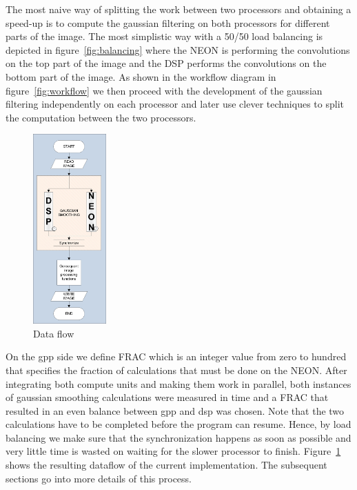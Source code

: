 The most naive way of splitting the work between two processors and obtaining a speed-up is to compute the gaussian filtering on both processors for different parts of the image. The most simplistic way with a 50/50 load balancing is depicted in figure~\ref{fig:balancing} where the NEON is performing the convolutions on the top part of the image and the DSP performs the convolutions on the bottom part of the image. As shown in the workflow diagram in figure~\ref{fig:workflow} we then proceed with the development of the gaussian filtering independently on each processor and later use clever techniques to split the computation between the two processors.


\begin{figure}
\centering
\includegraphics[width=0.25\textwidth]{drawings/model}
\caption{Data flow}
\label{fig:dataflow}
\end{figure}


On the gpp side we define FRAC which is an integer value from zero to hundred that specifies the fraction of calculations that must be done on the NEON. After integrating both compute units and making them work in parallel, both instances of gaussian smoothing calculations were measured in time and a FRAC that resulted in an even balance between gpp and dsp was chosen. Note that the two calculations have to be completed before the program can resume.
Hence, by load balancing we make sure that the synchronization happens as soon as possible and very little time is wasted on waiting for the slower processor to finish. Figure~\ref{fig:dataflow} shows the resulting dataflow of the current implementation. The subsequent sections go into more details of this process.




